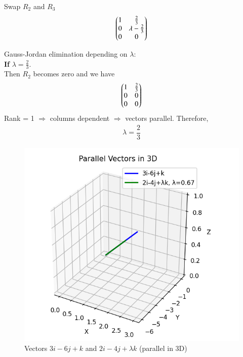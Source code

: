 \documentclass[journal]{IEEEtran}
\begin{document}
Swap $R_2$ and $R_3$
\begin{align}
    \begin{pmatrix}1 & \tfrac{2}{3} \\ 0 & \lambda - \tfrac{2}{3} \\ 0 & 0\end{pmatrix}
\end{align}

Gauss-Jordan elimination depending on \(\lambda\): \\


\textbf{If} \(\lambda = \tfrac{2}{3}.\) \\
Then $R_2$ becomes zero and we have
\begin{align}
    \begin{pmatrix}1 & \tfrac{2}{3} \\ 0 & 0 \\ 0 & 0\end{pmatrix}
\end{align}
 Rank = 1 \(\Rightarrow\) columns dependent \(\Rightarrow\) vectors parallel.
 Therefore,
 \begin{align}
     \lambda = \dfrac{2}{3}
 \end{align}


\newpage
\begin{figure}[H]
    \centering
    \includegraphics[width=0.7\columnwidth]{figs/fig.png}
    \caption{Vectors $3i-6j+k$ and $2i-4j+\lambda k$ (parallel in 3D)}
    \label{fig:Vectors}
\end{figure}
\end{document}
